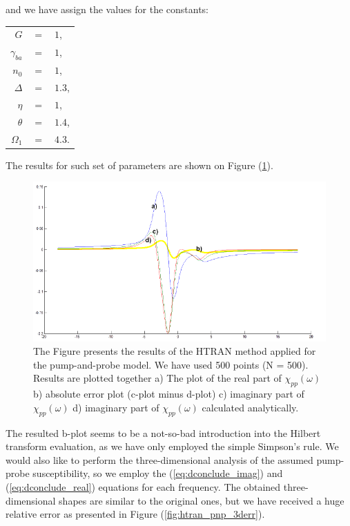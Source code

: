 \documentclass[12pt,twoside,a4paper]{article}
\numberwithin{equation}{subsection}
\numberwithin{figure}{subsection}
\begin{document}
and we have assign the values for the constants:
\begin{tabular}{r r l}
  $G$           & $=$ & $1$, \\
  $\gamma_{ba}$ & $=$ & $1$, \\
  $n_0$         & $=$ & $1$, \\
  $\Delta$      & $=$ & $1.3$, \\
  $\eta$        & $=$ & $1$, \\
  $\theta$      & $=$ & $1.4$, \\
  $\Omega_{1}$  & $=$ & $4.3$. \\
\end{tabular}

The results for such set of parameters are shown on Figure (\ref{fig:htran_pnp_2d}).

\begin{figure}
  \includegraphics[width=150mm]{img/htran_pnp_2d.png}
  \caption{The Figure presents the results of the HTRAN method applied for the pump-and-probe model. We have used 500 points (N =
  500). Results are plotted together 
    a) The plot of the real part of $\chi_{pp} (\omega )$ 
    b) absolute error plot (c-plot minus d-plot) 
    c) imaginary part of $\chi_{pp} (\omega )$
    d) imaginary part of ${\chi_{pp}}(\omega )$ calculated analytically.
    \label{fig:htran_pnp_2d}}
\end{figure}

The resulted b-plot seems to be a not-so-bad introduction into the Hilbert transform evaluation, as we have only employed the
simple Simpson's rule. We would also like to perform the three-dimensional analysis of the assumed pump-probe susceptibility, so we
employ the (\ref{eq:dconclude_imag}) and (\ref{eq:dconclude_real}) equations for each frequency. The obtained three-dimensional shapes are
similar to the original ones, but we have received a huge relative error as presented in Figure (\ref{fig:htran_pnp_3derr}).
\end{document}
